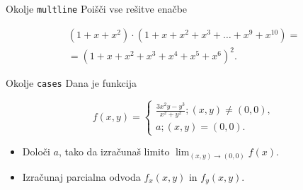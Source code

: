 \begin{frame}{Okolje \texttt{multline}}
	Poišči vse rešitve enačbe

	\begin{multline*}
		(1+x+x^2) \cdot (1+x+x^2+x^3+\ldots+x^9+x^{10}) =\\
		=(1+x+x^2+x^3+x^4+x^5+x^6)^2.
	\end{multline*}

\end{frame}

\begin{frame}{Okolje \texttt{cases}}
	Dana je funkcija
	
	\[
	f(x,y) = 
	\begin{cases}
		\frac{3x^2y-y^3}{x^2+y^2}; (x,y)\neq(0,0), \\
		a; (x,y)=(0,0).
	\end{cases}
	\]	

	\begin{itemize}
	\item Določi $a$, tako da izračunaš limito \( \lim_{(x,y)\to(0,0)} f(x). \)
	\item Izračunaj parcialna odvoda $f_x(x,y)$ in $f_y(x,y)$.
	\end{itemize}
\end{frame}
